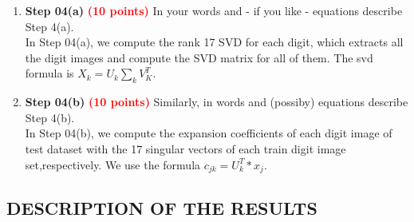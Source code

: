 \documentclass[dvipsnames,12pt]{article} %
\newcommand{\Brd}[1]{{\textbf{\textcolor{Red}{#1}}}}               %
\begin{document}
          \begin{enumerate}[label=\textbf{(\alph*}), leftmargin=48pt]


            \item \textbf{Step 04(a)} \Brd{(10 points)} In your words and - if you like - equations
              describe Step 4(a).\\
            In Step 04(a), we compute the rank 17 SVD for each digit, which extracts all the digit images and compute the SVD matrix for all of them. The svd formula is $X_k=U_k\sum_kV_K^T$.
            

            \vspace{06pt}

            \item \textbf{Step 04(b)} \Brd{(10 points)} Similarly, in words and (possiby) equations
              describe Step 4(b).\\
            In Step 04(b), we compute the expansion coefficients of each digit image of test dataset with the 17 singular vectors of each train digit image set,respectively. We use the formula $c_{jk}=U_k^T*x_j$.
         \end{enumerate}

        \subsection{DESCRIPTION OF THE RESULTS}
          \label{SECT 04.02:SVD RESULTS}
\end{document}
